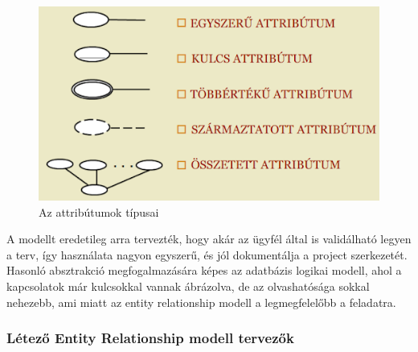 \documentclass[a4paper,12pt,oneside]{report}
\begin{document}
\begin{justify}
	\begin{figure}[h]
		\includegraphics[width=\textwidth]{contents/images/ermodell_attributes.png}
		\caption{Az attribútumok típusai \cite{book:example_er_attr} }
		\label{fig:ermodell_attributes}
	\end{figure}

	A modellt eredetileg arra tervezték, hogy akár az ügyfél által is validálható legyen a terv, így használata nagyon egyszerű, és jól dokumentálja a project szerkezetét. Hasonló absztrakció megfogalmazására képes az adatbázis logikai modell, ahol a kapcsolatok már kulcsokkal vannak ábrázolva, de az olvashatósága sokkal nehezebb, ami miatt az entity relationship modell a legmegfelelőbb a feladatra. 

\end{justify}

\newpage
\subsubsection{Létező Entity Relationship modell tervezők}
\end{document}
